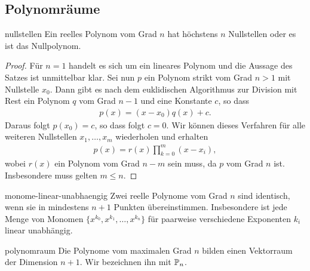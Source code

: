 \subsection{Polynomräume}

\begin{Satz}{nullstellen}
  Ein reelles Polynom vom Grad $n$ hat höchstens $n$ Nullstellen oder es ist das Nullpolynom.
\end{Satz}

\begin{proof}
  Für $n=1$ handelt es sich um ein lineares Polynom und die Aussage
  des Satzes ist unmittelbar klar. Sei nun $p$ ein Polynom strikt vom
  Grad $n>1$ mit Nullstelle $x_0$. Dann gibt es nach dem euklidischen
  Algorithmus zur Division mit Rest ein Polynom $q$ vom Grad $n-1$ und
  eine Konstante $c$, so dass
  \begin{gather}
    p(x) = (x-x_0)q(x)+c.
  \end{gather}
  Daraus folgt $p(x_0) = c$, so dass folgt $c=0$. Wir können dieses
  Verfahren für alle weiteren Nullstellen $x_1,\dots,x_m$ wiederholen
  und erhalten
  \begin{gather}
    p(x) =  r(x) \prod_{k=0}^m (x-x_i),
  \end{gather}
  wobei $r(x)$ ein Polynom vom Grad $n-m$ sein muss, da $p$ vom Grad
  $n$ ist. Insbesondere muss gelten $m\le n$.
\end{proof}

\begin{Korollar}{monome-linear-unabhaengig}
  Zwei reelle Polynome vom Grad $n$ sind identisch, wenn sie in
  mindestens $n+1$ Punkten übereinstimmen. Insbesondere ist jede Menge
  von Monomen $\{x^{k_0}, x^{k_1},\dots,x^{k_n}\}$ für paarweise
  verschiedene Exponenten $k_i$ linear unabhängig.
\end{Korollar}

\begin{Satz}{polynomraum}
  Die Polynome vom maximalen Grad $n$ bilden einen Vektorraum der
  Dimension $n+1$.  Wir bezeichnen ihn mit $\P_n$.
\end{Satz}

